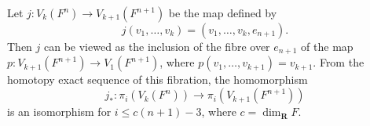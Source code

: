 Let $j: V_k(F^n) \to V_{k+1}(F^{n+1})$ be the map defined by
$$j(v_1, \ldots, v_k) = (v_1, \ldots, v_k, e_{n+1}).$$
Then $j$ can be viewed as the inclusion of the fibre over $e_{n+1}$ of the map
$p: V_{k+1}(F^{n+1}) \to V_1(F^{n+1})$, where $p(v_1, \ldots, v_{k+1}) = v_{k+1}$.
From the homotopy exact sequence of this fibration, the homomorphism
$$j_*: \pi_i(V_k(F^n)) \to \pi_i(V_{k+1}(F^{n+1}))$$
is an isomorphism for $i \leq c(n+1) - 3$, where $c = \dim_{\mathbf{R}} F$.
